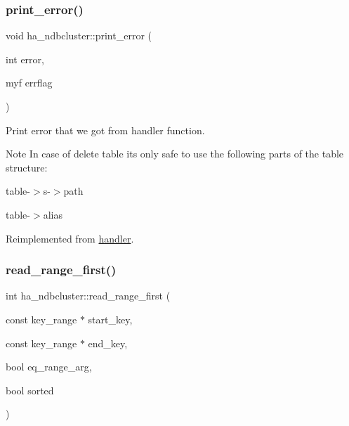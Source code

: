 \mbox{\label{classha__ndbcluster_ab4b4b9ed3726be8a4a0887785a5ed530}} 
\subsubsection{\texorpdfstring{print\+\_\+error()}{print\_error()}}
{\footnotesize\ttfamily void ha\+\_\+ndbcluster\+::print\+\_\+error (\begin{DoxyParamCaption}\item[{int}]{error,  }\item[{myf}]{errflag }\end{DoxyParamCaption})\hspace{0.3cm}{\ttfamily [virtual]}}

Print error that we got from handler function.

\begin{DoxyNote}{Note}
In case of delete table it\textquotesingle{}s only safe to use the following parts of the \textquotesingle{}table\textquotesingle{} structure\+:
\begin{DoxyItemize}
\item table-\/$>$s-\/$>$path
\item table-\/$>$alias 
\end{DoxyItemize}
\end{DoxyNote}


Reimplemented from \mbox{\hyperlink{classhandler_afda4f1390385a4dc0bfd2981fee23e6c}{handler}}.

\mbox{\label{classha__ndbcluster_a4ebf9b2b84870f08b62e5e3f5465aae8}} 
\subsubsection{\texorpdfstring{read\+\_\+range\+\_\+first()}{read\_range\_first()}}
{\footnotesize\ttfamily int ha\+\_\+ndbcluster\+::read\+\_\+range\+\_\+first (\begin{DoxyParamCaption}\item[{const key\+\_\+range $\ast$}]{start\+\_\+key,  }\item[{const key\+\_\+range $\ast$}]{end\+\_\+key,  }\item[{bool}]{eq\+\_\+range\+\_\+arg,  }\item[{bool}]{sorted }\end{DoxyParamCaption})\hspace{0.3cm}{\ttfamily [virtual]}}



